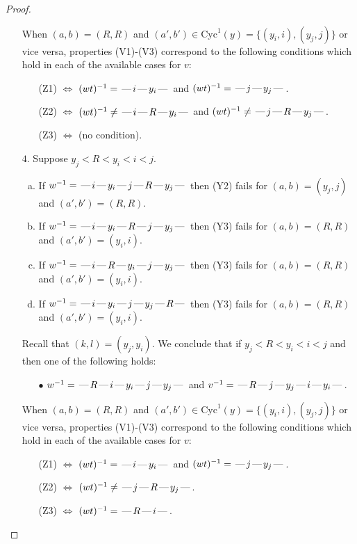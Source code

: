 \documentclass[10pt]{article}
\theoremstyle{definition}
\theoremstyle{definition}
\def\dash{\text{\hspace{0.5mm}---\hspace{0.5mm}}}
\def\Cyc{\mathrm{Cyc}}
\begin{document}
\begin{proof}
\begin{enumerate}
\begin{enumerate}
\end{enumerate}
When $(a,b)= (R, R)$ and $(a',b')\in \Cyc^1(y)=\{(y_i,i),(y_j,j)\}$ or vice versa,
properties (V1)-(V3) correspond to the following conditions which hold in
each of the available cases for $v$:
\begin{enumerate}
\item[](Z1) $\Leftrightarrow$ $(wt)^{-1} = \dash i \dash y_i \dash$  and $(wt)^{-1} = \dash j \dash y_j \dash$.
\item[](Z2) $\Leftrightarrow$ $(wt)^{-1} \neq \dash i \dash R \dash y_i \dash$  and $(wt)^{-1} \neq \dash j \dash R \dash y_j \dash$.
\item[](Z3) $\Leftrightarrow$ (no condition).
\end{enumerate}
\item[$4$.] Suppose $y_j < R < y_i < i < j$.
\begin{enumerate}[(a)]
\item If $w^{-1} = \dash i\dash y_i\dash j\dash R\dash y_j\dash $ then (Y2) fails for $(a,b)=(y_j,j)$ and $(a',b')=(R,R)$.
\item If $w^{-1} = \dash i\dash y_i\dash R\dash j\dash y_j\dash $ then (Y3) fails for $(a,b)=(R,R)$ and $(a',b')=(y_i,i)$.
\item If $w^{-1} = \dash i\dash R\dash y_i\dash j\dash y_j\dash $ then (Y3) fails for $(a,b)=(R,R)$ and $(a',b')=(y_i,i)$.
\item If $w^{-1} = \dash i\dash y_i\dash j\dash y_j\dash R\dash $ then (Y3) fails for $(a,b)=(R,R)$ and $(a',b')=(y_i,i)$.
\end{enumerate}
Recall that $(k,l) = (y_j,y_i)$.
We conclude that if $y_j < R < y_i < i < j$ and then one of the following holds:
\begin{enumerate}
\item[$\bullet$] $w^{-1} = \dash R\dash i\dash y_i\dash j\dash y_j\dash $ and $v^{-1} = \dash R\dash j\dash y_j\dash i\dash y_i\dash $.
\end{enumerate}
When $(a,b)= (R, R)$ and $(a',b')\in \Cyc^1(y)=\{(y_i,i),(y_j,j)\}$ or vice versa,
properties (V1)-(V3) correspond to the following conditions which hold in
each of the available cases for $v$:
\begin{enumerate}
\item[](Z1) $\Leftrightarrow$ $(wt)^{-1} = \dash i \dash y_i \dash$  and $(wt)^{-1} = \dash j \dash y_j \dash$.
\item[](Z2) $\Leftrightarrow$ $(wt)^{-1} \neq \dash j \dash R \dash y_j \dash$.
\item[](Z3) $\Leftrightarrow$ $(wt)^{-1} = \dash R \dash i \dash$.

\end{enumerate}
\end{enumerate}
\end{proof}
\end{document}
